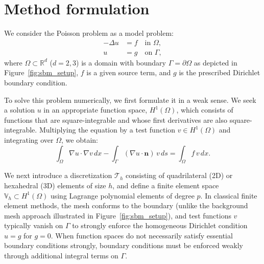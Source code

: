 \documentclass{elsarticle}
\begin{document}
\section{Method formulation}
\label{sec:method}
We consider the Poisson problem as a model problem:
\begin{align}
    -\Delta u & = f \quad \text{in } \Omega, \label{eq:poisson}      \\
    u         & = g \quad \text{on } \Gamma, \label{eq:dirichlet_bc}
\end{align}
where $\Omega \subset \mathbb{R}^d$ ($d=2,3$) is a domain with boundary $\Gamma =\partial\Omega$ as depicted in
Figure~\ref{fig:sbm_setup}, $f$ is a given source term, and $g$ is the prescribed Dirichlet boundary condition.

To solve this problem numerically, we first formulate it in a weak sense. We seek a solution $u$ in an appropriate
function space, $H^1(\Omega)$, which consists of functions that are square-integrable and whose first derivatives are
also square-integrable. Multiplying the equation by a test function $v \in H^1(\Omega)$ and integrating over $\Omega$,
we obtain:
\[
    \int_\Omega \nabla u \cdot \nabla v \, dx - \int_{\Gamma} (\nabla u \cdot \mathbf{n}) \, v \, ds =
    \int_\Omega f \, v \, dx.
\]

We next introduce a discretization \( \mathcal{T}_h \) consisting of quadrilateral (2D) or hexahedral (3D) elements of
size $h$, and define a finite element space $\mathbb{V}_h\subset H^1(\Omega)$ using Lagrange polynomial elements of
degree \( p \). In classical finite element methods, the mesh conforms to the boundary (unlike the background mesh
approach illustrated in Figure~\ref{fig:sbm_setup}), and test functions $v$ typically vanish on $\Gamma $ to strongly
enforce the homogeneous Dirichlet condition $u=g$ for $g=0$. When function spaces do not necessarily satisfy essential
boundary conditions strongly, boundary conditions must be enforced weakly through additional integral terms on
$\Gamma$.
\end{document}
